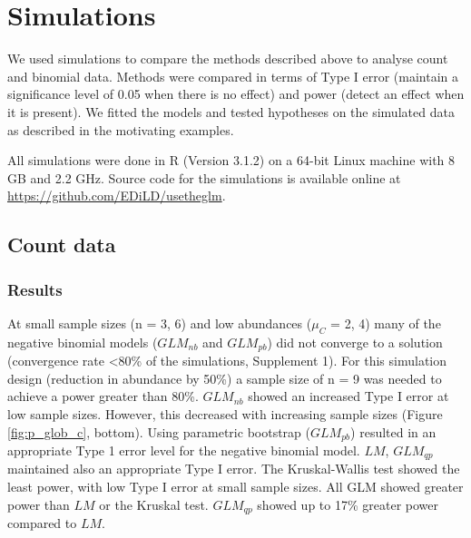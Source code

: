 \documentclass{scrartcl}
\begin{document}
\section{Simulations}
\label{sec:sim}
We used simulations to compare the methods described above to analyse count and binomial data.
Methods were compared in terms of Type I error (maintain a significance level of 0.05 when there is no effect) and power (detect an effect when it is present). 
We fitted the models and tested hypotheses on the simulated data as described in the motivating examples.

All simulations were done in R (Version 3.1.2) \citep{r_core_team_r:_2014} on a 64-bit Linux machine with 8 GB and 2.2 GHz.
Source code for the simulations is available online at \url{https://github.com/EDiLD/usetheglm}.

\subsection{Count data}
 

\subsubsection{Results}
At small sample sizes (n = {3, 6}) and low abundances ($\mu_C$ = {2, 4}) many of the negative binomial models ($GLM_{nb}$ and $GLM_{pb}$) did not converge to a solution (convergence rate \textless 80\% of the simulations, Supplement 1). 
For this simulation design (reduction in abundance by 50\%) a sample size of n = 9 was needed to achieve a power greater than 80\%.
$GLM_{nb}$ showed an increased Type I error at low sample sizes. 
However, this decreased with increasing sample sizes (Figure \ref{fig:p_glob_c}, bottom).
Using parametric bootstrap ($GLM_{pb}$) resulted in an appropriate Type 1 error level for the negative binomial model.
$LM$, $GLM_{qp}$ maintained also an appropriate Type I error.
The Kruskal-Wallis test showed the least power, with low Type I error at small sample sizes. 
All GLM showed greater power than $LM$ or the Kruskal test. 
$GLM_{qp}$ showed up to 17\% greater power compared to $LM$.
\end{document}
